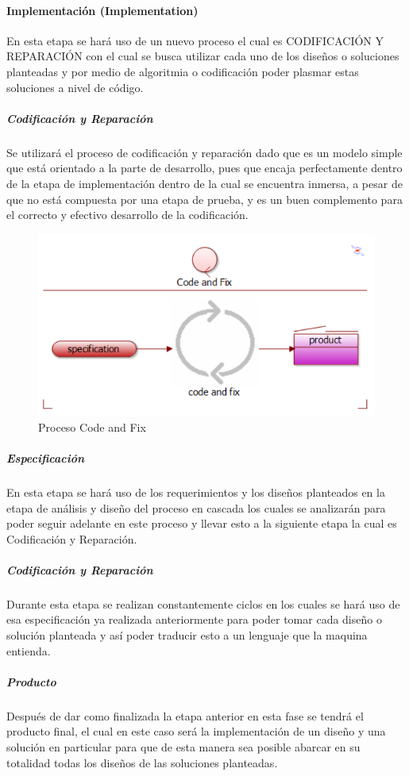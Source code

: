 \paragraph{Implementación (Implementation)}
En esta etapa se hará uso de un nuevo proceso el cual es CODIFICACIÓN Y REPARACIÓN con el cual se busca utilizar cada uno de los diseños o soluciones planteadas y por medio de algoritmia o codificación poder plasmar estas soluciones a nivel de código.

\subparagraph{Codificación y Reparación}
Se utilizará el proceso de codificación y reparación dado que es un modelo simple que está orientado a la parte de desarrollo, pues que encaja perfectamente dentro de la etapa de implementación dentro de la cual se encuentra inmersa, a pesar de que no está compuesta por una etapa de prueba, y es un buen complemento para el correcto y efectivo desarrollo de la codificación.
\begin{figure}[h]
	\centering
	\includegraphics[scale=0.9,]{imagenes/Metodologia/Code-and-fix}
	\caption{Proceso Code and Fix}
	\label{fig:cronograma}
\end{figure}

\subparagraph{Especificación}
En esta etapa se hará uso de los requerimientos y los diseños planteados en la etapa de análisis y diseño del proceso en cascada los cuales se analizarán para poder seguir adelante en este proceso y llevar esto a la siguiente etapa la cual es Codificación y Reparación.

\subparagraph{Codificación y Reparación}
Durante esta etapa se realizan constantemente ciclos en los cuales se hará uso de esa especificación ya realizada anteriormente para poder tomar cada diseño o solución planteada y así poder traducir esto a un lenguaje que la maquina entienda.

\subparagraph{Producto}
Después de dar como finalizada la etapa anterior en esta fase se tendrá el producto final, el cual en este caso será la implementación de un diseño y una solución en particular para que de esta manera sea posible abarcar en su totalidad todas los diseños de  las soluciones planteadas.

